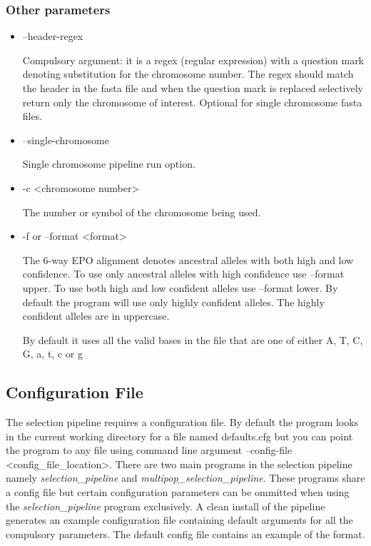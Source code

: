 \documentclass[a4paper,10pt]{article}
\begin{document}
\subsubsection{Other parameters}
\begin{itemize}
\item --header-regex 

Compulsory argument: it is a regex (regular expression) with a question mark denoting
substitution for the chromosome number. The regex should match the
header in the fasta file and when the question mark is replaced
selectively return only the chromosome of interest. Optional for
single chromosome fasta files.

\item --single-chromosome

Single chromosome pipeline run option.

\item -c <chromosome number>

The number or symbol of the chromosome being used.

\item -f or --format <format>

The 6-way EPO alignment denotes ancestral alleles with both high and
low confidence. To use only ancestral alleles with high confidence use
--format upper. To use both high and low confident alleles use
--format lower. By default the program will use only highly confident
alleles. The highly confident alleles are in uppercase. 

By default it uses all the valid bases in the file that are one  of either A, T, C, G, a, t, c or g

\end{itemize}
\subsection{Configuration File}
The selection pipeline requires a configuration file. By default the
program looks in the current working directory for a file named
defaults.cfg but you can point the program to any file using command
line argument --config-file <config\_file\_location>. There are two
main programs in the selection pipeline namely
\emph{selection\_pipeline} and \emph{multipop\_selection\_pipeline}. These
programs share a config file but certain configuration parameters can
be ommitted when using the \emph{selection\_pipeline} program
exclusively. A clean install of the pipeline generates an example
configuration file containing default arguments for all the compulsory
parameters. The default config file contains an example of the format.
\end{document}
